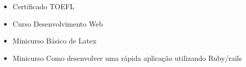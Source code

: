 












\smallskip
\begin{itemize}
\item Certificado TOEFL
\smallskip
\item Curso Desenvolvimento Web
\smallskip
\item Minicurso Básico de Latex
\smallskip
\item Minicurso Como desenvolver uma rápida aplicação utilizando
Ruby/rails
\smallskip
\end{itemize}
\bigskip

